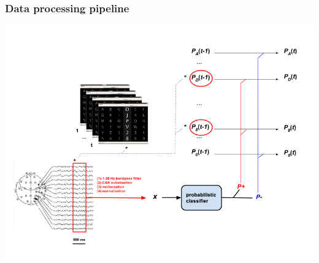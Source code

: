 \documentclass{beamer}
\begin{document}
\begin{frame}\frametitle{Data processing pipeline}
	\includegraphics[width=\linewidth]{overview.png}
\end{frame}
\end{document}
